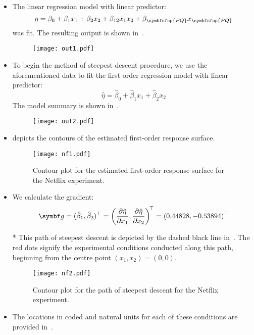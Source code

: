 \begin{itemize}
      \item The linear regression model with linear predictor:
            \[ \eta=\beta_0+\beta_1x_1+\beta_2x_2+\beta_{12}x_1x_2+\beta_{\symbfsfup{PQ}}x_{\symbfsfup{PQ}} \]
            was fit. The resulting output is shown in~.
            \begin{figure}[!htbp]
                  \centering
                  \texttt{[image: out1.pdf]}
                  \caption{}\label{fig:netflixout1}
            \end{figure}
      \item To begin the method of steepest descent procedure, we use the aforementioned data to fit the first
            order regression model with linear predictor:
            \[ \hat{\eta}=\hat{\beta}_0+\hat{\beta}_1x_1+\hat{\beta}_2x_2 \]
            The model summary is shown in~.
            \begin{figure}[!htbp]
                  \centering
                  \texttt{[image: out2.pdf]}
                  \caption{}\label{fig:netflixout2}
            \end{figure}
      \item {} depicts the contours of the estimated first-order response surface.
            \begin{figure}[!htbp]
                  \centering
                  \texttt{[image: nf1.pdf]}
                  \caption{Contour plot for the estimated first-order response surface for the Netflix experiment.}\label{fig:nf1}
            \end{figure}
      \item We calculate the gradient:
            \[ \Vector{g}=(\hat{\beta}_1,\hat{\beta}_2)^\top=\biggl(\pdv{\hat{\eta}}{x_1},\pdv{\hat{\eta}}{x_2}\biggr)^{\!\top}=(0.44828,-0.53894)^\top \]
      \item[*] This path of steepest descent is depicted by the dashed black line in~. The red dots signify
            the experimental conditions conducted along this path, beginning from the centre point $ (x_1,x_2)=(0,0) $.
            \begin{figure}[!htbp]
                  \centering
                  \texttt{[image: nf2.pdf]}
                  \caption{Contour plot for the path of steepest descent for the Netflix experiment.}\label{fig:nf2}
            \end{figure}
      \item The locations in coded and natural units for each of these conditions are provided in~.

\end{itemize}
